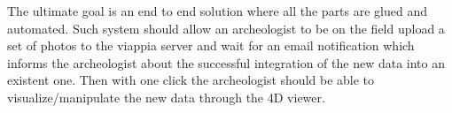 The ultimate goal is an end to end solution where all the parts are glued and
automated. Such system should allow an archeologist to be on the field
upload a set of photos to the viappia server and wait for an email notification which
informs the archeologist about the successful integration of the new data into
an existent one. Then with one click the archeologist should be able to 
visualize/manipulate the new data through the 4D viewer.
